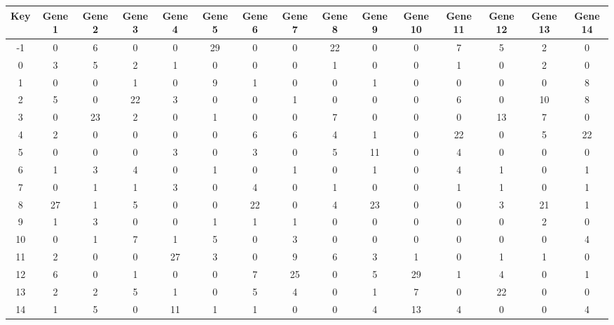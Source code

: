 \begin{tabular}{|c|c|c|c|c|c|c|c|c|c|c|c|c|c|c|}
\hline
Key & Gene 1 & Gene 2 & Gene 3 & Gene 4 & Gene 5 & Gene 6 & Gene 7 & Gene 8 & Gene 9 & Gene 10 & Gene 11 & Gene 12 & Gene 13 & Gene 14 \\
\hline
-1 & 0 & 6 & 0 & 0 & 29 & 0 & 0 & 22 & 0 & 0 & 7 & 5 & 2 & 0 \\
0 & 3 & 5 & 2 & 1 & 0 & 0 & 0 & 1 & 0 & 0 & 1 & 0 & 2 & 0 \\
1 & 0 & 0 & 1 & 0 & 9 & 1 & 0 & 0 & 1 & 0 & 0 & 0 & 0 & 8 \\
2 & 5 & 0 & 22 & 3 & 0 & 0 & 1 & 0 & 0 & 0 & 6 & 0 & 10 & 8 \\
3 & 0 & 23 & 2 & 0 & 1 & 0 & 0 & 7 & 0 & 0 & 0 & 13 & 7 & 0 \\
4 & 2 & 0 & 0 & 0 & 0 & 6 & 6 & 4 & 1 & 0 & 22 & 0 & 5 & 22 \\
5 & 0 & 0 & 0 & 3 & 0 & 3 & 0 & 5 & 11 & 0 & 4 & 0 & 0 & 0 \\
6 & 1 & 3 & 4 & 0 & 1 & 0 & 1 & 0 & 1 & 0 & 4 & 1 & 0 & 1 \\
7 & 0 & 1 & 1 & 3 & 0 & 4 & 0 & 1 & 0 & 0 & 1 & 1 & 0 & 1 \\
8 & 27 & 1 & 5 & 0 & 0 & 22 & 0 & 4 & 23 & 0 & 0 & 3 & 21 & 1 \\
9 & 1 & 3 & 0 & 0 & 1 & 1 & 1 & 0 & 0 & 0 & 0 & 0 & 2 & 0 \\
10 & 0 & 1 & 7 & 1 & 5 & 0 & 3 & 0 & 0 & 0 & 0 & 0 & 0 & 4 \\
11 & 2 & 0 & 0 & 27 & 3 & 0 & 9 & 6 & 3 & 1 & 0 & 1 & 1 & 0 \\
12 & 6 & 0 & 1 & 0 & 0 & 7 & 25 & 0 & 5 & 29 & 1 & 4 & 0 & 1 \\
13 & 2 & 2 & 5 & 1 & 0 & 5 & 4 & 0 & 1 & 7 & 0 & 22 & 0 & 0 \\
14 & 1 & 5 & 0 & 11 & 1 & 1 & 0 & 0 & 4 & 13 & 4 & 0 & 0 & 4 \\
\hline
\end{tabular}